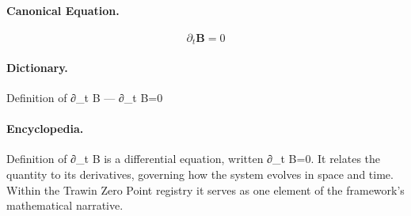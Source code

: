 \paragraph{Canonical Equation.}
\[
\partial_t \mathbf{B}=0
\]

\paragraph{Dictionary.}
Definition of ∂\_t B — ∂\_t B=0

\paragraph{Encyclopedia.}
Definition of ∂\_t B is a differential equation, written ∂\_t B=0. It relates the quantity to its derivatives, governing how the system evolves in space and time. Within the Trawin Zero Point registry it serves as one element of the framework's mathematical narrative.
